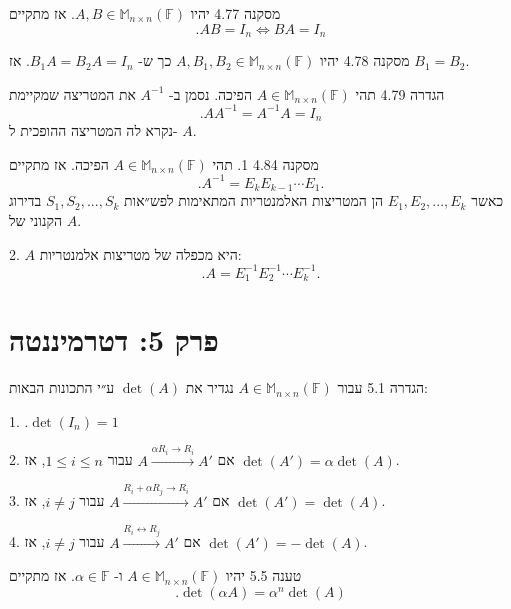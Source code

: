 \documentclass[a4paper, 11pt]{article}
\begin{document}
\begin{envbox}[thmcolor]{מסקנה 4.77}
יהיו $A,B\in\mathbb{M}_{n\times n}(\mathbb{F})$. אז מתקיים 
\[
.AB=I_n \iff BA=I_n
\]
\end{envbox}

\begin{envbox}[thmcolor]{מסקנה 4.78}
יהיו $A,B_1,B_2\in\mathbb{M}_{n\times n}(\mathbb{F})$ כך ש- $B_1A=B_2A=I_n$. אז $B_1=B_2$.
\end{envbox}

\begin{envbox}[defcolor]{הגדרה 4.79}
תהי $A\in\mathbb{M}_{n\times n}(\mathbb{F})$ הפיכה. נסמן ב- $A^{-1}$ את המטריצה שמקיימת 
\[
.AA^{-1}=A^{-1}A=I_n
\]
 נקרא לה המטריצה ההופכית ל- $A$.
\end{envbox}

\begin{envbox}[thmcolor]{מסקנה 4.84}
1.  תהי $A\in\mathbb{M}_{n\times n}(\mathbb{F})$ הפיכה. אז מתקיים 
\[
.A^{-1}=E_kE_{k-1}\cdots E_1.
\]
 כאשר $E_1,E_2,...,E_k$ הן המטריצות האלמנטריות המתאימות לפש״אות $S_1,S_2,...,S_k$ בדירוג הקנוני של $A$.

2.  $A$ היא מכפלה של מטריצות אלמנטריות: 
\[
.A=E_1^{-1}E_2^{-1}\cdots E_k^{-1}.
\]
\end{envbox}

\newpage

\section{פרק 5: דטרמיננטה}

\begin{envbox}[defcolor]{הגדרה 5.1}
עבור $A\in\mathbb{M}_{n\times n}(\mathbb{F})$ נגדיר את $\det(A)$ ע״י התכונות הבאות:

1.  $.\det(I_n)=1$

2.  אם $A\xrightarrow{\alpha R_i\to R_i}A'$ עבור $1\leq i \leq n$, אז $\det(A')=\alpha \det(A)$.

3.  אם $A\xrightarrow{R_i+\alpha R_j\to R_i}A'$ עבור $i\neq j$, אז $\det(A')=\det(A)$.

4.  אם $A\xrightarrow{R_i\leftrightarrow R_j}A'$ עבור $i\neq j$, אז $\det(A')=-\det(A)$.
\end{envbox}

\begin{envbox}[thmcolor]{טענה 5.5}
יהיו $A\in\mathbb{M}_{n\times n}(\mathbb{F})$ ו- $\alpha\in\mathbb{F}$. אז מתקיים 
\[
.\det(\alpha A)=\alpha^n\det(A)
\]
\end{envbox}
\end{document}
